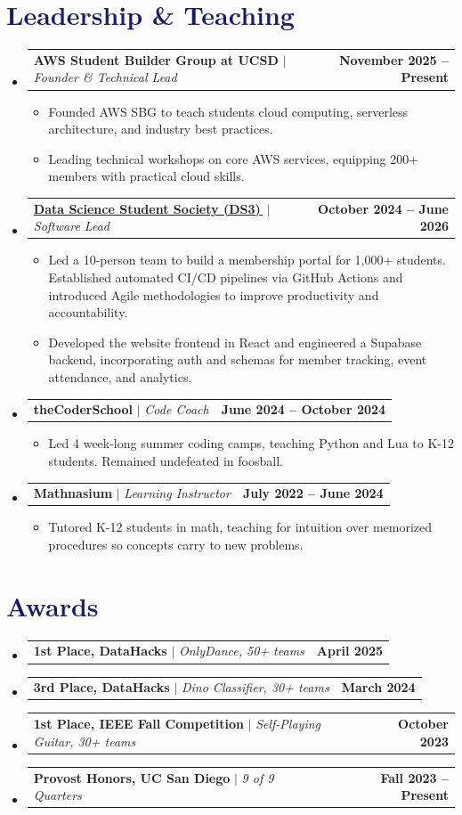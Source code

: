 \documentclass[letterpaper,11pt]{article}
\makeatletter
\newcommand{\resumeItem}[1]{
  \item\small{
    {#1\vspace{\bulletGap}}
  }
}
\newcommand{\resumeProjectHeading}[2]{
    \needspace{4\baselineskip}\item
    \begin{tabular*}{1.001\textwidth}{l@{\extracolsep{\fill}}r}
      \small#1 & \textbf{\small #2}\\
    \end{tabular*}\vspace{\headingGap}
}
\newcommand{\resumeSubHeadingListStart}{\begin{itemize}[leftmargin=0.0in, label={}]}
\newcommand{\resumeSubHeadingListEnd}{\end{itemize}}
\newcommand{\resumeItemListStart}{\begin{itemize}[itemsep=0pt, parsep=0pt]}
\newcommand{\resumeItemListEnd}{\end{itemize}\vspace{\entryGap}}
\newcommand{\resumeAward}[2]{\resumeProjectHeading{#1}{#2}\vspace{\awardGap}}
\newcommand{\cvlink}[2]{\href{#1}{\underline{#2}\,\raisebox{0.1\height}{\tiny\faExternalLink*}}}
\newcommand\accentColor{MidnightBlue}
\newlength{\headingGap}\setlength{\headingGap}{-4pt}            %
\newlength{\bulletGap}\setlength{\bulletGap}{0pt}               %
\newlength{\entryGap}\setlength{\entryGap}{-15pt}               %
\newlength{\awardGap}\setlength{\awardGap}{-20pt}               %
\makeatother
\begin{document}
\section{\textcolor{\accentColor}{Leadership \& Teaching}}
\resumeSubHeadingListStart
\resumeProjectHeading
{\textbf{AWS Student Builder Group at UCSD} $|$ \emph{Founder \& Technical Lead}}{November 2025 -- Present}
\resumeItemListStart
\resumeItem{Founded AWS SBG to teach students cloud computing, serverless architecture, and industry best practices.}
\resumeItem{Leading technical workshops on core AWS services, equipping 200+ members with practical cloud skills.}
\resumeItemListEnd
\resumeProjectHeading{\textbf{\cvlink{https://www.ds3atucsd.com/}{Data Science Student Society (DS3)}} $|$ \emph{Software Lead}}{October 2024 -- June 2026}
\resumeItemListStart
\resumeItem{Led a 10-person team to build a membership portal for 1,000+ students. Established automated CI/CD pipelines via GitHub Actions and introduced Agile methodologies to improve productivity and accountability.}
\resumeItem{Developed the website frontend in React and engineered a Supabase backend, incorporating auth and schemas for member tracking, event attendance, and analytics.}
\resumeItemListEnd

\resumeProjectHeading{\textbf{theCoderSchool} $|$ \emph{Code Coach}}{June 2024 -- October 2024}
\resumeItemListStart
\resumeItem{Led 4 week-long summer coding camps, teaching Python and Lua to K-12 students. Remained undefeated in foosball.}
\resumeItemListEnd

\resumeProjectHeading{\textbf{Mathnasium} $|$ \emph{Learning Instructor}}{July 2022 -- June 2024}
\resumeItemListStart
\resumeItem{Tutored K-12 students in math, teaching for intuition over memorized procedures so concepts carry to new problems.}
\resumeItemListEnd
\resumeSubHeadingListEnd

\section{\textcolor{\accentColor}{Awards}}
\resumeSubHeadingListStart
\resumeAward{\textbf{1st Place, DataHacks} $|$ \emph{OnlyDance, 50+ teams}}{April 2025}
\resumeAward{\textbf{3rd Place, DataHacks} $|$ \emph{Dino Classifier, 30+ teams}}{March 2024}
\resumeAward{\textbf{1st Place, IEEE Fall Competition} $|$ \emph{Self-Playing Guitar, 30+ teams}}{October 2023}
\resumeAward{\textbf{Provost Honors, UC San Diego} $|$ \emph{9 of 9 Quarters}}{Fall 2023 -- Present}
\resumeSubHeadingListEnd
\end{document}
